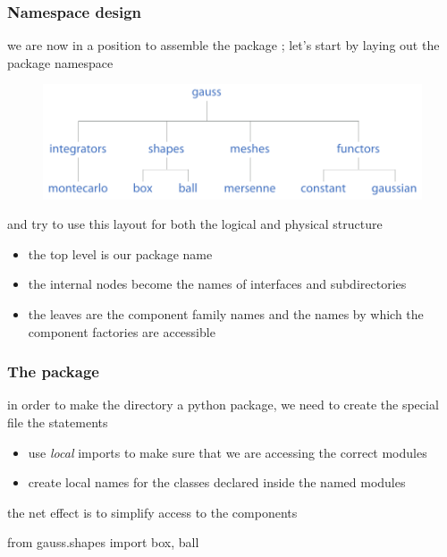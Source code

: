 %
%


\begin{frame}[fragile]
%
  \frametitle{Namespace design}
%
  we are now in a position to assemble the package ; let's start by laying out
  the package namespace
%
  \begin{figure}
    \includegraphics[scale=0.5]{figures/gauss-namespace.pdf}
  \end{figure}
%
  and try to use this layout for both the logical and physical structure
  \begin{itemize}
  \item the top level is our package name
  \item the internal nodes become the names of interfaces and subdirectories
  \item the leaves are the component family names and the names by which the component
    factories are accessible
  \end{itemize}
%
\end{frame}

\begin{frame}[fragile]
%
  \frametitle{The  package}
%
  in order to make the directory  a python package, we need to create
  the special file 
%
%
  the  statements 
  \begin{itemize}
  \item use \emph{local} imports to make sure that we are accessing the correct modules
  \item create local names for the classes declared inside the named modules
  \end{itemize}
%
  the net effect is to simplify access to the components 
%
  \begin{ipython}{}
    from gauss.shapes import box, ball
  \end{ipython}
\end{frame}

